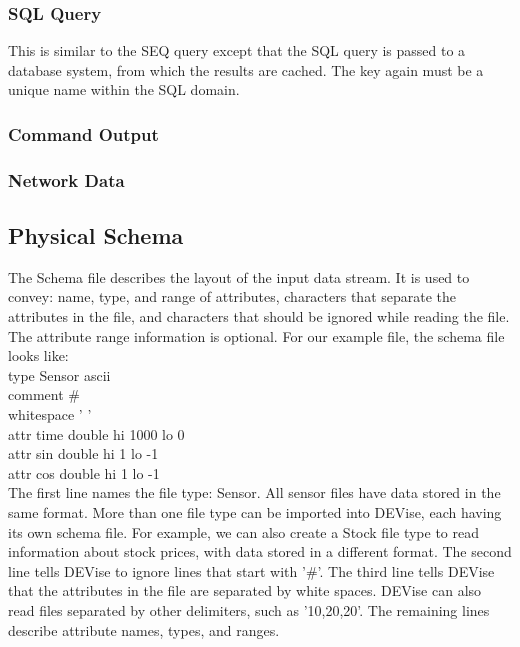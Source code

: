 \subsubsection{SQL Query}

This is similar to the SEQ query except that the SQL query is passed to a database system, from which the results are cached. The key again must be a unique name within the SQL domain.

\subsubsection{Command Output}
\subsubsection{Network Data}

\subsection{Physical Schema}

 The Schema file describes the layout of the input data stream. It is used to convey: name, type, and range of attributes, characters that separate the attributes in the file, and characters that should be ignored while reading the file. The attribute range information is optional. For our example file, the schema file looks like: \\

 type Sensor ascii \\
 comment \# \\
 whitespace ' ' \\
 attr time double hi 1000 lo 0 \\
 attr sin double hi 1 lo -1 \\
 attr cos double hi 1 lo -1 \\

 The first line names the file type: Sensor. All sensor files have data stored in the same format. More than one file type can be imported into DEVise, each having its own schema file. For example, we can also create a Stock file type to read information about stock prices, with data stored in a different format. The second line tells DEVise to ignore lines that start with '\#'. The third line tells DEVise that the attributes in the file are separated by white spaces. DEVise can also read files separated by other delimiters, such as '10,20,20'. The remaining lines describe attribute names, types, and ranges. 

